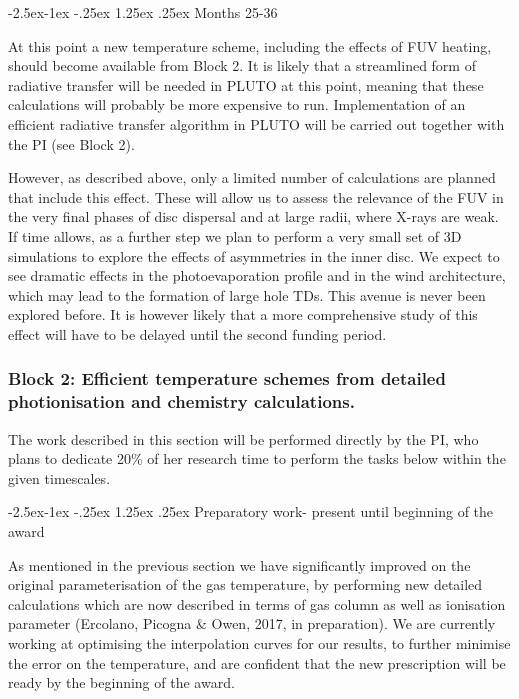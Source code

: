\documentclass[10pt,fleqn,twoside]{article}
\makeatletter
\renewcommand\paragraph{\@startsection{paragraph}{4}{\z@}%
            {-2.5ex\@plus -1ex \@minus -.25ex}%
            {1.25ex \@plus .25ex}%
            {\normalfont\normalsize\bfseries}}
\makeatother
\begin{document}
\paragraph{Months 25-36} 

At this point a new temperature scheme, including the effects of FUV heating, should become available from
Block 2.  It is likely that a streamlined form of radiative transfer
will be needed in PLUTO at this point, meaning that these calculations will
probably be more expensive to run. Implementation of an efficient
radiative transfer algorithm in PLUTO will be carried out together
with the PI (see Block 2). 

However, as described above, only a
limited number of calculations are planned that include this
effect. These will allow us to assess the relevance of the FUV in the
very final phases of disc dispersal and at large radii, where X-rays
are weak. \\

If time allows, as a further step we plan to perform a very small set of 3D
simulations to explore the effects of asymmetries in the inner
disc. We expect to see dramatic effects in the photoevaporation
profile and in the wind architecture, which may lead to the formation
of large hole TDs. This avenue is never been explored before. It is
however likely that a more comprehensive study of this effect will
have to be delayed until the second funding period. \\ 

\subsubsection{Block 2: Efficient temperature schemes from detailed
  photionisation and chemistry calculations.}

The work described in this section will be performed directly by the
PI, who plans to dedicate 20\% of her research time to perform the
tasks below within the given timescales. 

\paragraph{Preparatory work- present until beginning of the award}

As mentioned in the previous section we have significantly improved on
the original parameterisation of the gas temperature, by performing new detailed calculations
which are now described in terms of gas column as well as ionisation
parameter (Ercolano, Picogna \& Owen, 2017, in preparation). We are currently working at
optimising the interpolation curves for our results, to further
minimise the error on the temperature, and are confident that the new
prescription will be ready by the beginning of the award. 
\end{document}
